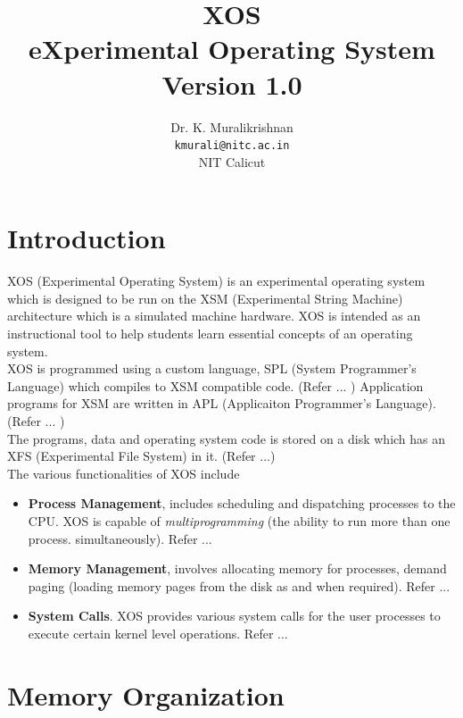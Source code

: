 \documentclass[10pt]{report}
\title{XOS \\ eXperimental Operating System \\
Version 1.0}
\author{Dr. K. Muralikrishnan  \\ \texttt{kmurali@nitc.ac.in} \\ {NIT Calicut} }
\begin{document}
\maketitle
\pagebreak

\thispagestyle{plain}

\tableofcontents
\pagebreak

\chapter{Introduction}
\label{chp:osintro}

XOS (Experimental Operating System) is an experimental operating system  which is designed to be run on the  XSM  (Experimental String Machine) architecture which is a simulated machine hardware. XOS is intended as an instructional tool to help students learn essential concepts of an operating system. 
\vspace{0.1in} \\
XOS is programmed using a custom language, SPL (System Programmer's Language) which compiles to XSM compatible code. (Refer ... ) Application programs for XSM are written in APL (Applicaiton Programmer's Language). (Refer ... ) 
\vspace{0.1in} \\
The programs, data and operating system code is stored on a disk which has an XFS (Experimental File System) in it. (Refer ...)\\

The various functionalities of XOS include
\begin{itemize}
\item \textbf{Process Management}, includes scheduling and dispatching processes to the CPU. XOS is capable of \textit{multiprogramming} (the ability to run more than one process.  simultaneously). Refer ...
\item \textbf{Memory Management}, involves allocating memory for processes, demand paging (loading memory pages from the disk as and when required). Refer ...
\item \textbf{System Calls}. XOS provides various system calls for the user processes to execute certain kernel level operations. Refer ...
\end{itemize} 


\chapter{Memory Organization}
\label{chp:memoryorg}
\end{document}
